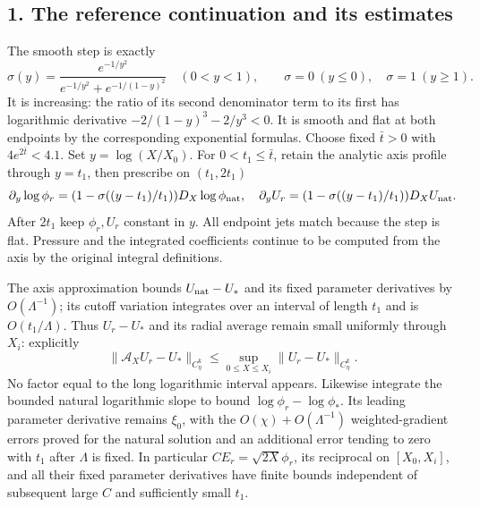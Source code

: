 \documentclass[10pt,a4paper]{article}
\begin{document}
\subsection{1. The reference continuation and its estimates}

The smooth step is exactly
\[
\sigma(y)=\frac{e^{-1/y^2}}{e^{-1/y^2}+e^{-1/(1-y)^2}}\quad(0<y<1),
\qquad \sigma=0\ (y\le0),\quad\sigma=1\ (y\ge1).
\]
It is increasing: the ratio of its second denominator term to its first has logarithmic derivative \(-2/(1-y)^3-2/y^3<0\). It is smooth and flat at both endpoints by the corresponding exponential formulas. Choose fixed \(\bar t>0\) with \(4e^{2\bar t}<4.1\). Set \(y=\log(X/X_0)\). For \(0<t_1\le\bar t\), retain the analytic axis profile through \(y=t_1\), then prescribe on \((t_1,2t_1)\)
\[
\partial_y\log\phi_r=(1-\sigma((y-t_1)/t_1))D_X\log\phi_{\rm nat},
\quad \partial_yU_r=(1-\sigma((y-t_1)/t_1))D_XU_{\rm nat}.
\]
After \(2t_1\) keep \(\phi_r,U_r\) constant in \(y\). All endpoint jets match because the step is flat. Pressure and the integrated coefficients continue to be computed from the axis by the original integral definitions.

The axis approximation bounds \(U_{\rm nat}-U_*\) and its fixed parameter derivatives by \(O(\Lambda^{-1})\); its cutoff variation integrates over an interval of length \(t_1\) and is \(O(t_1/\Lambda)\). Thus \(U_r-U_*\) and its radial average remain small uniformly through \(X_i\): explicitly
\[
\|\mathcal A_XU_r-U_*\|_{C^k_\eta}
\le\sup_{0\le X\le X_i}\|U_r-U_*\|_{C^k_\eta}.
\]
No factor equal to the long logarithmic interval appears. Likewise integrate the bounded natural logarithmic slope to bound \(\log\phi_r-\log\phi_*\). Its leading parameter derivative remains \(\xi_0\), with the \(O(\chi)+O(\Lambda^{-1})\) weighted-gradient errors proved for the natural solution and an additional error tending to zero with \(t_1\) after \(\Lambda\) is fixed. In particular \(CE_r=\sqrt{2X}\phi_r\), its reciprocal on \([X_0,X_i]\), and all their fixed parameter derivatives have finite bounds independent of subsequent large \(C\) and sufficiently small \(t_1\).
\end{document}
